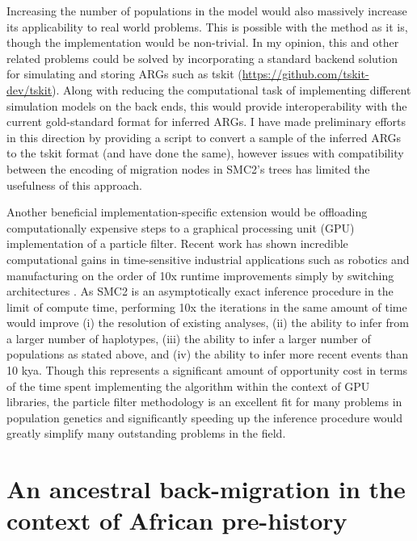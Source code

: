 Increasing the number of populations in the model would also massively increase its applicability to real world problems. This is possible with the method as it is, though the implementation would be non-trivial. In my opinion, this and other related problems could be solved by incorporating a standard backend solution for simulating and storing ARGs such as tskit (\url{https://github.com/tskit-dev/tskit}). Along with reducing the computational task of implementing different simulation models on the back ends, this would provide interoperability with the current gold-standard format for inferred ARGs. I have made preliminary efforts in this direction by providing a script to convert a sample of the inferred ARGs to the tskit format (and \textcite{Speidel2019a} have done the same), however issues with compatibility between the encoding of migration nodes in SMC2's trees has limited the usefulness of this approach. 

Another beneficial implementation-specific extension would be offloading computationally expensive steps to a graphical processing unit (GPU) implementation of a particle filter. Recent work has shown incredible computational gains in time-sensitive industrial applications such as robotics and manufacturing on the order of 10x runtime improvements simply by switching architectures \cite{Gelencser-Horvath2013,Murray2012,Lopez2015a}. As SMC2 is an asymptotically exact inference procedure in the limit of compute time, performing 10x the iterations in the same amount of time would improve (i) the resolution of existing analyses, (ii) the ability to infer from a larger number of haplotypes, (iii) the ability to infer a larger number of populations as stated above, and (iv) the ability to infer more recent events than 10 kya. Though this represents a significant amount of opportunity cost in terms of the time spent implementing the algorithm within the context of GPU libraries, the particle filter methodology is an excellent fit for many problems in population genetics and significantly speeding up the inference procedure would greatly simplify many outstanding problems in the field. 

\section{An ancestral back-migration in the context of African pre-history}

